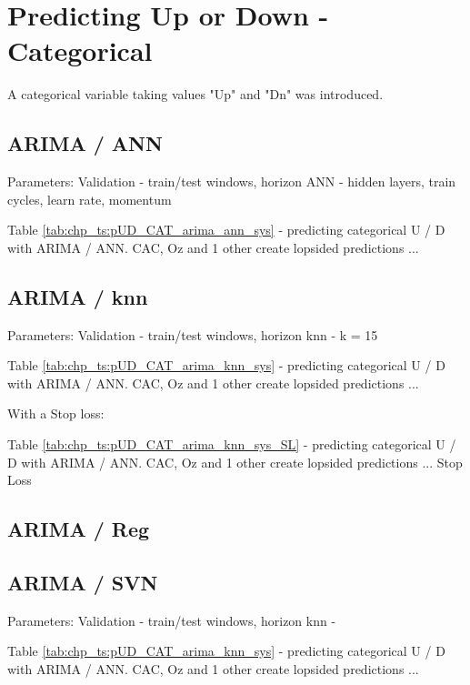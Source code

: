 \section{Predicting Up or Down - Categorical}
A categorical variable taking values "Up" and "Dn" was introduced.

\subsection{ARIMA / ANN}
Parameters:
Validation - train/test windows, horizon
ANN - hidden layers, train cycles, learn rate, momentum

Table \ref{tab:chp_ts:pUD_CAT_arima_ann_sys} - predicting categorical U / D with ARIMA / ANN. CAC, Oz and 1 other create lopsided predictions ... 



\subsection{ARIMA / knn}
Parameters:
Validation - train/test windows, horizon
knn - k = 15

Table \ref{tab:chp_ts:pUD_CAT_arima_knn_sys} - predicting categorical U / D with ARIMA / ANN. CAC, Oz and 1 other create lopsided predictions ...



With a Stop loss:

Table \ref{tab:chp_ts:pUD_CAT_arima_knn_sys_SL} - predicting categorical U / D with ARIMA / ANN. CAC, Oz and 1 other create lopsided predictions ... Stop Loss



\subsection{ARIMA / Reg}

\subsection{ARIMA / SVN}
Parameters:
Validation - train/test windows, horizon
knn - 

Table \ref{tab:chp_ts:pUD_CAT_arima_knn_sys} - predicting categorical U / D with ARIMA / ANN. CAC, Oz and 1 other create lopsided predictions ...

